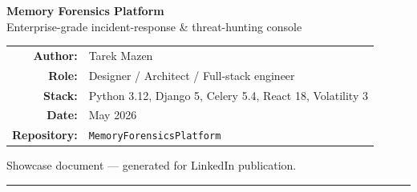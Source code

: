 \documentclass[11pt,a4paper]{article}
\begin{document}
\begin{titlepage}
\pagecolor{ink}\color{white}
\begin{center}
\vspace*{2cm}

{\Huge\bfseries\color{accent} Memory Forensics Platform}\\[6pt]
{\large\color{slate2} Enterprise-grade incident-response \& threat-hunting console}\\[3cm]


\vspace{2.5cm}
\begin{tabular}{rl}
\color{slate2}\textbf{Author:}    & \color{white} Tarek Mazen \\
\color{slate2}\textbf{Role:}      & \color{white} Designer / Architect / Full-stack engineer \\
\color{slate2}\textbf{Stack:}     & \color{white} Python 3.12, Django 5, Celery 5.4, React 18, Volatility 3 \\
\color{slate2}\textbf{Date:}      & \color{white} May 2026 \\
\color{slate2}\textbf{Repository:}& \color{white} \texttt{MemoryForensicsPlatform} \\
\end{tabular}

\vfill
{\color{slate2}\small Showcase document — generated for LinkedIn publication.}
\end{center}
\end{titlepage}

\nopagecolor
\color{black}

\hypersetup{linkcolor=accent}
\tableofcontents
\vspace{1em}\hrule\vspace{1em}
\end{document}
